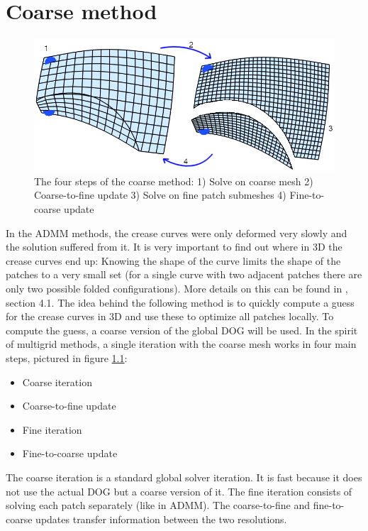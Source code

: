 \documentclass[a4paper,twoside,12pt,nochapterprefix]{scrbook}
\begin{document}
\chapter{Coarse method}\label{sec:coarse}
\begin{figure}
    \centering
    \includegraphics[width=0.8\linewidth]{figures/0311_coarse_pipeline}
    \caption{The four steps of the coarse method: 1) Solve on coarse mesh 2) Coarse-to-fine update 3) Solve on fine patch submeshes 4) Fine-to-coarse update}
     \label{fig:coarse_method}
\end{figure}
In the ADMM methods, the crease curves were only deformed very slowly and the solution suffered from it. It is very important to find out where in 3D the crease curves end up: Knowing the shape of the curve limits the shape of the patches to a very small set (for a single curve with two adjacent patches there are only two possible folded configurations). More details on this can be found in \cite{Rabinovich:CurvedFolds:2019}, section 4.1.\newline
The idea behind the following method is to quickly compute a guess for the crease curves in 3D and use these to optimize all patches locally. To compute the guess, a coarse version of the global DOG will be used.\newline
In the spirit of multigrid methods, a single iteration with the coarse mesh works in four main steps, pictured in figure \ref{fig:coarse_method}:\newline%
\begin{itemize}
\item Coarse iteration
\item Coarse-to-fine update
\item Fine iteration
\item Fine-to-coarse update
\end{itemize}
The coarse iteration is a standard global solver iteration. It is fast because it does not use the actual DOG but a coarse version of it. The fine iteration consists of solving each patch separately (like in ADMM). The coarse-to-fine and fine-to-coarse updates transfer information between the two resolutions.\newline
\end{document}
